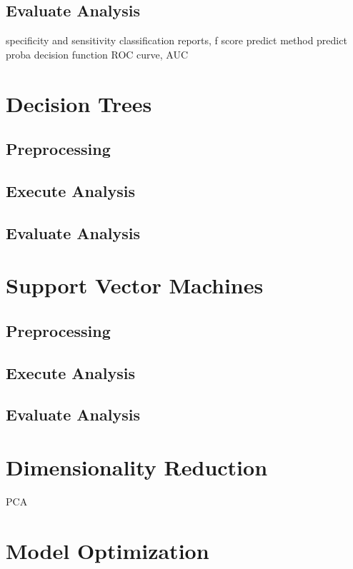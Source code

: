 \documentclass[sigconf]{acmart}
\begin{document}
\subsection{Evaluate Analysis}
specificity and sensitivity
classification reports, f score
predict method
predict proba
decision function
ROC curve, AUC

\section{Decision Trees}

\subsection{Preprocessing}

\subsection{Execute Analysis}

\subsection{Evaluate Analysis}


\section{Support Vector Machines}

\subsection{Preprocessing}

\subsection{Execute Analysis}

\subsection{Evaluate Analysis}



\section{Dimensionality Reduction}

PCA

\section{Model Optimization}
\end{document}
